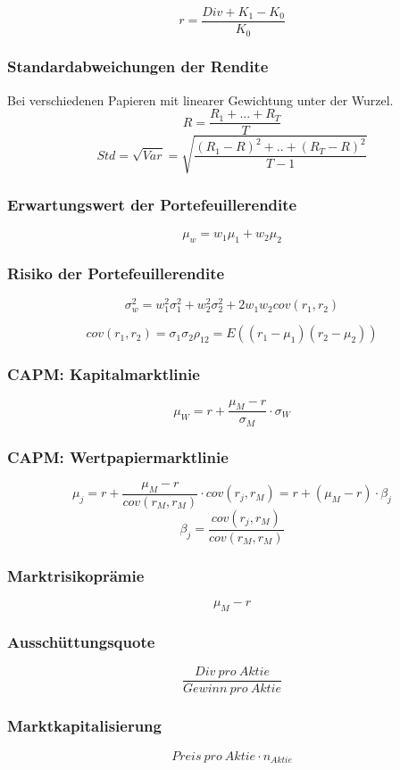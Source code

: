 \[r = \frac{Div + K_1 - K_0}{K_0}\]

\subsubsection{Standardabweichungen der Rendite}
Bei verschiedenen Papieren mit linearer Gewichtung unter der Wurzel.
\[R = \frac{R_1+...+R_T}{T}\]
\[Std = \sqrt{Var} = \sqrt{\frac{(R_1-R)^2+..+(R_T-R)^2}{T-1}}\]

\subsubsection{Erwartungswert der Portefeuillerendite}
\[\mu_w = w_1\mu_1 + w_2\mu_2\]

\subsubsection{Risiko der Portefeuillerendite}
\[\sigma^2_w = w^2_1\sigma^2_1+w^2_2\sigma^2_2+2w_1w_2cov(r_1,r_2)\]

\[cov(r_1,r_2) = \sigma_1\sigma_2\rho_{12} = E((r_1-\mu_1)(r_2-\mu_2))\]

\subsubsection{CAPM: Kapitalmarktlinie}
\[\mu_W = r + \frac{\mu_M-r}{\sigma_M}\cdot\sigma_W\]

\subsubsection{CAPM: Wertpapiermarktlinie}
\[\mu_j = r + \frac{\mu_M-r}{cov(r_M,r_M)}\cdot cov(r_j,r_M) = r + (\mu_M-r)\cdot \beta_j\]
\[\beta_j = \frac{cov(r_j,r_M)}{cov(r_M,r_M)}\]

\subsubsection{Marktrisikoprämie}
\[\mu_M - r\]

\subsubsection{Ausschüttungsquote}
\[\frac{Div~pro~Aktie}{Gewinn~pro~Aktie}\]

\subsubsection{Marktkapitalisierung}
\[Preis~pro~Aktie \cdot n_{Aktie}\]


